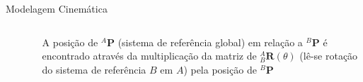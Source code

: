 \documentclass[aspectratio=169]{beamer}
\begin{document}
\begin{frame}[t]{Modelagem Cinemática}
\begin{itemize}
\begin{columns}
\begin{column}[c]{0.5\textwidth}
\begin{figure}[!ht]
                \end{figure}
            \end{column}
            \begin{column}[c]{0.5\textwidth}
                A posição de ${}^A\mathbf{P}$ (sistema de referência global) em relação a ${}^B\mathbf{P}$ é encontrado através da multiplicação da matriz de ${}_B^A \mathbf{R}(\theta)$ (lê-se rotação do sistema de referência $B$ em $A$) pela posição de ${}^B\mathbf{P}$
            \end{column}
        \end{columns}
    \end{itemize}
\end{frame}
\end{document}
